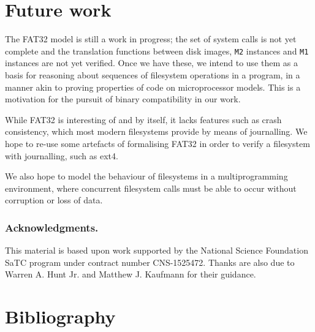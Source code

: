 \documentclass[submission,copyright,creativecommons]{eptcs}
\begin{document}
\section{Future work}

The FAT32 model is still a work in progress; the set of system calls
is not yet complete and the translation functions between disk images,
\texttt{M2} instances and \texttt{M1} instances are not yet
verified. Once we have these, we intend to use them as a basis for
reasoning about sequences of filesystem operations in a program, in a
manner akin to proving properties of code on microprocessor
models. This is a motivation for the pursuit of binary compatibility
in our work.

While FAT32 is interesting of and by itself, it lacks features such as
crash consistency, which most modern filesystems provide by means of
journalling. We hope to re-use some artefacts of formalising FAT32 in
order to verify a filesystem with journalling, such as ext4.

We also hope to model the behaviour of filesystems in a
multiprogramming environment, where concurrent filesystem calls must
be able to occur without corruption or loss of data.

\subsubsection*{Acknowledgments.} This material is based upon work
supported by the National Science Foundation SaTC program under
contract number CNS-1525472. Thanks are also due to Warren A. Hunt
Jr. and Matthew J. Kaufmann for their guidance.

\section{Bibliography}



\end{document}
